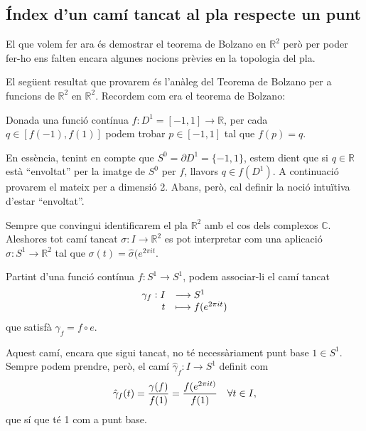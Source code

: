 \documentclass[../main.tex]{subfiles}
\begin{document}
\subsection{Índex d'un camí tancat al pla respecte un punt}

El que volem fer ara és demostrar el teorema de Bolzano en $\mathbb{R}^2$ però per poder fer-ho ens falten encara algunes nocions prèvies en la topologia del pla.

El següent resultat que provarem és l'anàleg del Teorema de Bolzano per a funcions de $\mathbb{R}^2$ en $\mathbb{R}^2$. Recordem com era el teorema de Bolzano:
\begin{ter}
\label{ter:bolzano} Donada una funció contínua $f:D^1=[-1,1]\rightarrow\mathbb{R}$, per cada $q\in[f(-1),f(1)]$ podem trobar $p\in [-1,1]$ tal que $f(p) = q$.
\end{ter}

En essència, tenint en compte que $S^0 = \partial D^1 = \{-1,1\}$, estem dient que si $q\in \mathbb{R}$ està ``envoltat'' per la imatge de $S^0$ per $f$, llavors $q\in f(D^1)$. A continuació provarem el mateix per a dimensió 2. Abans, però, cal definir la noció intuïtiva d'estar ``envoltat''.

\begin{nota}
Sempre que convingui identificarem el pla $\mathbb{R}^2$ amb el cos dels complexos $\mathbb{C}$. Aleshores tot camí tancat $\sigma:I\rightarrow \mathbb{R}^2$ es pot interpretar com una aplicació $\hat{\sigma}:S^1\rightarrow \mathbb{R}^2$ tal que $\sigma(t) = \hat{\sigma}(e^{2\pi it}$.
\end{nota}

\begin{defi}
\label{def:camitancatassociat} Partint d'una funció contínua $f:S^1\rightarrow S^1$, podem associar-li el camí tancat
\begin{equation}
    \notag
    \begin{array}{rl}
        \gamma_f:I & \longrightarrow S^1 \\
        t & \longmapsto f(e^{2\pi it})
    \end{array}
\end{equation}
    que satisfà $\gamma_f = f\circ e$.
\end{defi}

Aquest camí, encara que sigui tancat, no té necessàriament punt base $1\in S^1$. Sempre podem prendre, però, el camí $\hat{\gamma}_f:I\rightarrow S^1$ definit com 
\begin{equation}
    \notag
    \hat{\gamma}_f(t) = \frac{\gamma(f)}{f(1)}=\frac{f(e^{2\pi it)}}{f(1)}\quad \forall t\in I,
\end{equation}
que sí que té 1 com a punt base.
\end{document}
